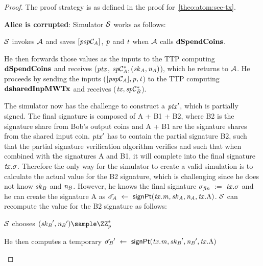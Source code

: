 \begin{proof}
    The proof strategy is as defined in the proof for~\cref{theo:atom:sec-tx}.

    \textbf{Alice is corrupted}: Simulator $\mathcal{S}$ works as follows:
    \begin{asparaenum}
        \item $\mathcal{S}$ invokes $\mathcal{A}$ and saves $[\mathit{psp}\mathcal{C}_{\mathit{A}}]$, $\mathit{p}$ and $\mathit{t}$ when $\mathcal{A}$ calls $\mathbf{dSpendCoins}$.
        \item He then forwards those values as the inputs to the TTP computing $\mathbf{dSpendCoins}$ and receives ($\mathit{ptx}$, $\mathit{sp}\mathcal{C}_{\mathit{A}}^*, (\mathit{sk}_{\mathit{A}}, \mathit{\mathit{n}_{\mathit{A}}})$), which he returns to $\mathcal{A}$.
        He proceeds by sending the inputs ($[\mathit{psp}\mathcal{C}_{\mathit{A}}], \mathit{p}, \mathit{t}$) to the TTP computing $\mathbf{dsharedInpMWTx}$ and receives ($\mathit{tx}, \mathit{sp}\mathcal{C}_{\mathit{B}}^*$).
        \item The simulator now has the challenge to construct a ${\mathit{ptx}}'$, which is partially signed.
        The final signature is composed of A + B1 + B2, where B2 is the signature share from Bob's output coins and A + B1 are the signature shares from the shared input coin.
        ${\mathit{ptx}}'$ has to contain the partial signature B2, such that the partial signature verification algorithm verifies and such that when combined with the signatures A and B1, it will complete into the final signature $\mathit{tx}.\sigma$.
        Therefore the only way for the simulator to create a valid simulation is to calculate the actual value for the B2 signature, which is challenging since he does not know $\mathit{sk}_{\mathit{B}}$ and $\mathit{\mathit{n}_{\mathit{B}}}$.
        However, he knows the final signature $\sigma_{\mathit{fin}} ~:=~ \mathit{tx}.\sigma$ and he can create the signature A as $\tilde{\sigma_{\mathit{A}}} ~\leftarrow~ \mathsf{signPt}(\mathit{tx}.\mathit{m}, \mathit{sk}_{\mathit{A}}, \mathit{\mathit{n}_{\mathit{A}}}, \mathit{tx}.\Lambda)$.
        $\mathcal{S}$ can recompute the value for the B2 signature as follows:
        \begin{asparaenum}
            \item $\mathcal{S}$ chooses $(\funStarAlt{\varSecKeyBob}, \funStarAlt{\varNonceBob}) \sample \cnstIntegersPrimeWithoutZero{\varPrime}$
            \item He then computes a temporary ${\tilde{\sigma_{\mathit{B}}}}' ~\leftarrow~ \mathsf{signPt}(\mathit{tx}.\mathit{m}, {\mathit{sk}_{\mathit{B}}}', {\mathit{\mathit{n}_{\mathit{B}}}}', \mathit{tx}.\Lambda)$

\end{asparaenum}
\end{asparaenum}
\end{proof}
